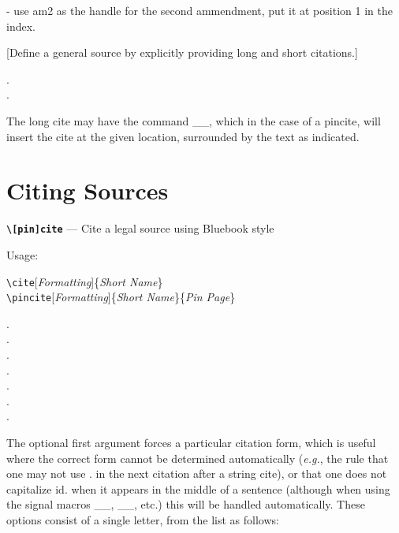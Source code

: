   - use am2 as the
 handle for the second ammendment, put it at position 1 in the index.

[Define a general source by explicitly providing long and short citations.]
 \begin{Example}
   
   . \\
   .
 \end{Example}

 \noindent The long cite may have the command _\Pin_, which in the case of 
 a pincite, will insert the cite at the given location, surrounded by the text as indicated.
\section{Citing Sources}

\noindent\texttt{\large\bf\textbackslash{}[pin]cite} --- Cite a legal source using Bluebook style

\noindent Usage: 

 \texttt{\textbackslash{}cite}[\textit{Formatting}]\{\textit{Short Name}\} \\
 \hspace*{\parindent}\texttt{\textbackslash{}pincite}[\textit{Formatting}]\{\textit{Short Name}\}\{\textit{Pin Page}\} 

 \begin{Example}
   \cite[l]{Marbury}. \\ 
   . \\
   . \\
   . \\
   . \\
   \See {}. \\
   \Cf {}.
 \end{Example}
	 
 \noindent The optional first argument forces a particular citation form, which is useful where the correct form cannot be determined automatically
 (\textit{e.g.}, the rule that one may not use \Id. in the next citation after a string cite), or that one does not capitalize id. 
 when it appears in the middle of a sentence (although when using the signal macros _\See_, _\Seealso_, etc.) this will be
 handled automatically. These options consist of a single letter, from the list as follows:  

